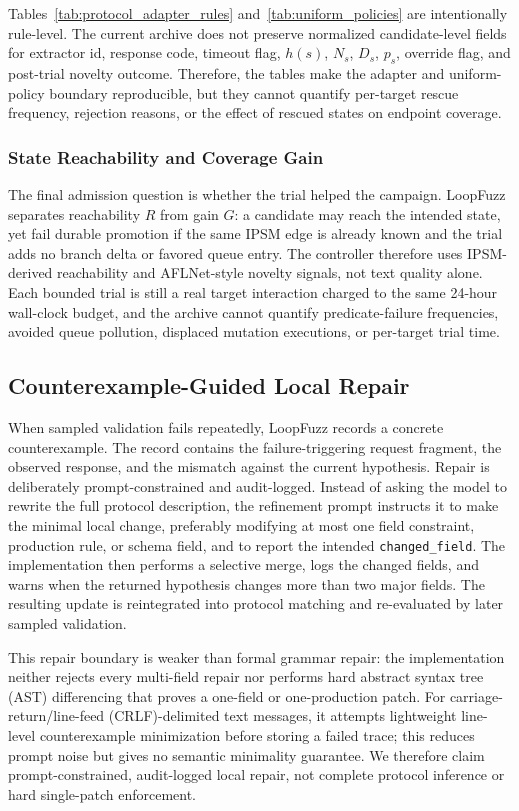 \documentclass[final,5p,times,number]{elsarticle}
\begin{document}
Tables~\ref{tab:protocol_adapter_rules} and~\ref{tab:uniform_policies} are intentionally rule-level. The current archive does not preserve normalized candidate-level fields for extractor id, response code, timeout flag, $h(s)$, $N_s$, $D_s$, $p_s$, override flag, and post-trial novelty outcome. Therefore, the tables make the adapter and uniform-policy boundary reproducible, but they cannot quantify per-target rescue frequency, rejection reasons, or the effect of rescued states on endpoint coverage.

\subsubsection{State Reachability and Coverage Gain}
The final admission question is whether the trial helped the campaign. LoopFuzz separates reachability $R$ from gain $G$: a candidate may reach the intended state, yet fail durable promotion if the same IPSM edge is already known and the trial adds no branch delta or favored queue entry. The controller therefore uses IPSM-derived reachability and AFLNet-style novelty signals, not text quality alone. Each bounded trial is still a real target interaction charged to the same 24-hour wall-clock budget, and the archive cannot quantify predicate-failure frequencies, avoided queue pollution, displaced mutation executions, or per-target trial time.

\subsection{Counterexample-Guided Local Repair}
When sampled validation fails repeatedly, LoopFuzz records a concrete counterexample. The record contains the failure-triggering request fragment, the observed response, and the mismatch against the current hypothesis. Repair is deliberately prompt-constrained and audit-logged. Instead of asking the model to rewrite the full protocol description, the refinement prompt instructs it to make the minimal local change, preferably modifying at most one field constraint, production rule, or schema field, and to report the intended \texttt{changed\_field}. The implementation then performs a selective merge, logs the changed fields, and warns when the returned hypothesis changes more than two major fields. The resulting update is reintegrated into protocol matching and re-evaluated by later sampled validation.

This repair boundary is weaker than formal grammar repair: the implementation neither rejects every multi-field repair nor performs hard abstract syntax tree (AST) differencing that proves a one-field or one-production patch. For carriage-return/line-feed (CRLF)-delimited text messages, it attempts lightweight line-level counterexample minimization before storing a failed trace; this reduces prompt noise but gives no semantic minimality guarantee. We therefore claim prompt-constrained, audit-logged local repair, not complete protocol inference or hard single-patch enforcement.
\end{document}
